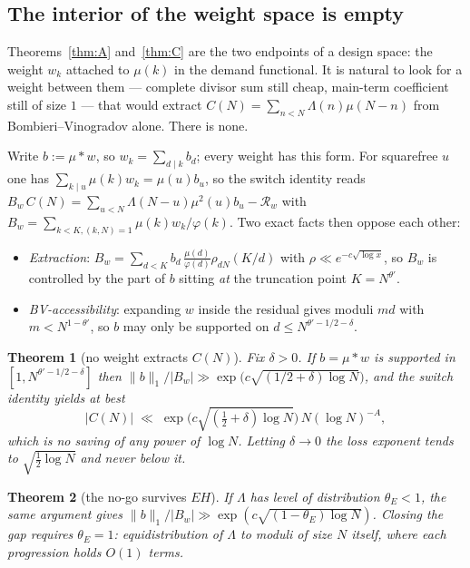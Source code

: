 \documentclass[11pt,a4paper]{article}
\theoremstyle{plain}
\newtheorem{theorem}{Theorem}
\theoremstyle{definition}
\begin{document}
\subsection{The interior of the weight space is empty}

Theorems~\ref{thm:A} and~\ref{thm:C} are the two endpoints of a design
space: the weight $w_k$ attached to $\mu(k)$ in the demand functional.
It is natural to look for a weight between them --- complete divisor
sum still cheap, main-term coefficient still of size $1$ --- that would
extract $C(N)=\sum_{n<N}\Lambda(n)\mu(N-n)$ from
Bombieri--Vinogradov alone. There is none.

Write $b := \mu*w$, so $w_k=\sum_{d\mid k}b_d$; every weight has this
form. For squarefree $u$ one has $\sum_{k\mid u}\mu(k)w_k=\mu(u)b_u$,
so the switch identity reads
$B_w\,C(N)=\sum_{u<N}\Lambda(N-u)\mu^2(u)b_u-\mathcal R_w$ with
$B_w=\sum_{k<K,(k,N)=1}\mu(k)w_k/\varphi(k)$. Two exact facts then
oppose each other:

\begin{itemize}
\item \emph{Extraction}:
  $B_w=\sum_{d<K}b_d\,\frac{\mu(d)}{\varphi(d)}\rho_{dN}(K/d)$ with
  $\rho \ll e^{-c\sqrt{\log x}}$, so $B_w$ is controlled by the part of
  $b$ sitting \emph{at} the truncation point $K=N^{\theta'}$.
\item \emph{BV-accessibility}: expanding $w$ inside the residual gives
  moduli $md$ with $m<N^{1-\theta'}$, so $b$ may only be supported on
  $d\le N^{\theta'-1/2-\delta}$.
\end{itemize}

\begin{theorem}[no weight extracts $C(N)$]\label{thm:D}
Fix $\delta>0$. If $b=\mu*w$ is supported in
$[1,N^{\theta'-1/2-\delta}]$ then
$\|b\|_1/|B_w| \gg \exp\bigl(c\sqrt{(1/2+\delta)\log N}\bigr)$, and the
switch identity yields at best
\[
  |C(N)|\;\ll\;\exp\bigl(c\sqrt{(\tfrac12+\delta)\log N}\bigr)\,
  N(\log N)^{-A},
\]
which is no saving of any power of $\log N$. Letting $\delta\to0$ the
loss exponent tends to $\sqrt{\tfrac12\log N}$ and never below it.
\end{theorem}

\begin{theorem}[the no-go survives $EH$]\label{thm:Dprime}
If $\Lambda$ has level of distribution $\theta_E<1$, the same argument
gives $\|b\|_1/|B_w| \gg \exp(c\sqrt{(1-\theta_E)\log N})$. Closing the
gap requires $\theta_E=1$: equidistribution of $\Lambda$ to moduli of
size $N$ itself, where each progression holds $O(1)$ terms.
\end{theorem}
\end{document}
